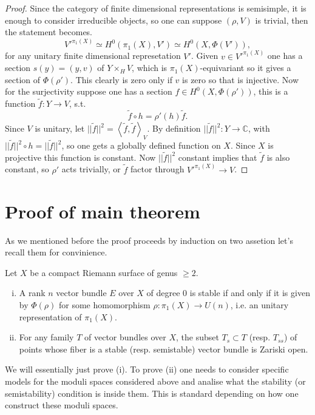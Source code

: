 \begin{proof}
Since the category of finite dimensional representations is
semisimple, it is enough to consider irreducible objects, so one can
suppose $(\rho,V)$ is trivial, then the statement becomes.
\[V'^{\pi_1(X)} \simeq H^0(\pi_1(X),V') \simeq
H^0(X,\Phi(V')),\]
for any unitary finite dimensional represetation $V'$.
Given $v \in V'^{\pi_1(X)}$ one has a section $s(y) = (y,v)$ of
$Y\times_HV$, which is $\pi_1(X)$-equivariant so it gives a section of
$\Phi(\rho')$. This clearly is zero only if $v$ is zero so that is
injective. 
Now for the surjectivity suppose one has a section $f \in
H^0(X,\Phi(\rho'))$, this is a function $\tilde{f}: Y \rightarrow V$, s.t.
\[\tilde{f}\circ h = \rho'(h) \tilde{f}.\]
Since $V$ is unitary, let $||\tilde{f}||^2 =
\left<\tilde{f},\tilde{f}\right>_{V}$. By definition
$||\tilde{f}||^2:Y \rightarrow \mathbb{C}$, with $||\tilde{f}||^2\circ h =
||\tilde{f}||^2$, so one gets a globally defined function on
$X$. Since $X$ is projective this function is constant. Now
$||\tilde{f}||^2$ constant implies that $\tilde{f}$ is also constant,
so $\rho'$ acts trivially, or $\tilde{f}$ factor through
$V'^{\pi_1(X)} \rightarrow V$.
\end{proof}

\section{Proof of main theorem}

As we mentioned before the proof proceeds by induction on two assetion
let's recall them for convinience.

\begin{thm}
Let $X$ be a compact Riemann surface of genus $\geq 2$.
\begin{enumerate}[(i)]
\item A rank $n$ vector bundle $E$ over $X$ of degree 0 is stable if and only if it
is given by $\Phi(\rho)$ for some homomorphism $\rho: \pi_1(X) \rightarrow
U(n)$, i.e. an unitary representation of $\pi_1(X)$.
\item For any family $T$ of vector bundles over $X$, the subset $T_s
  \subset T$ (resp. $T_{ss}$) of points whose fiber is a stable
  (resp. semistable) vector bundle is Zariski open.
\end{enumerate}
\end{thm}

We will essentially just prove (i). To prove (ii) one needs to
consider specific models for the moduli spaces considered above and
analise what the stability (or semistability) condition is inside
them. This is standard depending on how one construct these moduli
spaces.

